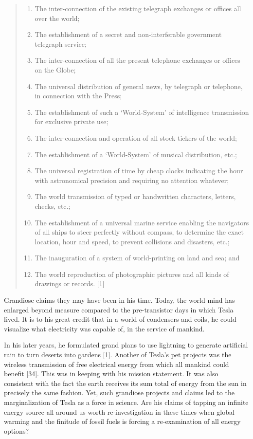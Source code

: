 \documentclass[
  12pt,
  british,
  a4paper,
]{article}
\providecommand{\tightlist}{%
  \setlength{\itemsep}{0pt}\setlength{\parskip}{0pt}}
\begin{document}
\begin{quote}
\begin{enumerate}
\tightlist
\item
  The inter-connection of the existing telegraph exchanges or offices
  all over the world;
\item
  The establishment of a secret and non-interferable government
  telegraph service;
\item
  The inter-connection of all the present telephone exchanges or offices
  on the Globe;
\item
  The universal distribution of general news, by telegraph or telephone,
  in connection with the Press;
\item
  The establishment of such a `World-System' of intelligence
  transmission for exclusive private use;
\item
  The inter-connection and operation of all stock tickers of the world;
\item
  The establishment of a `World-System' of musical distribution, etc.;
\item
  The universal registration of time by cheap clocks indicating the hour
  with astronomical precision and requiring no attention whatever;
\item
  The world transmission of typed or handwritten characters, letters,
  checks, etc.;
\item
  The establishment of a universal marine service enabling the
  navigators of all ships to steer perfectly without compass, to
  determine the exact location, hour and speed, to prevent collisions
  and disasters, etc.;
\item
  The inauguration of a system of world-printing on land and sea; and
\item
  The world reproduction of photographic pictures and all kinds of
  drawings or records. {[}1{]}
\end{enumerate}
\end{quote}

Grandiose claims they may have been in his time. Today, the world-mind
has enlarged beyond measure compared to the pre-transistor days in which
Tesla lived. It is to his great credit that in a world of condensers and
coils, he could visualize what electricity was capable of, in the
service of mankind.

In his later years, he formulated grand plans to use lightning to
generate artificial rain to turn deserts into gardens {[}1{]}. Another
of Tesla's pet projects was the wireless transmission of free electrical
energy from which all mankind could benefit {[}34{]}. This was in
keeping with his mission statement. It was also consistent with the fact
the earth receives its sum total of energy from the sun in precisely the
same fashion. Yet, such grandiose projects and claims led to the
marginalization of Tesla as a force in science. Are his claims of
tapping an infinite energy source all around us worth re-investigation
in these times when global warming and the finitude of fossil fuels is
forcing a re-examination of all energy options?
\end{document}
